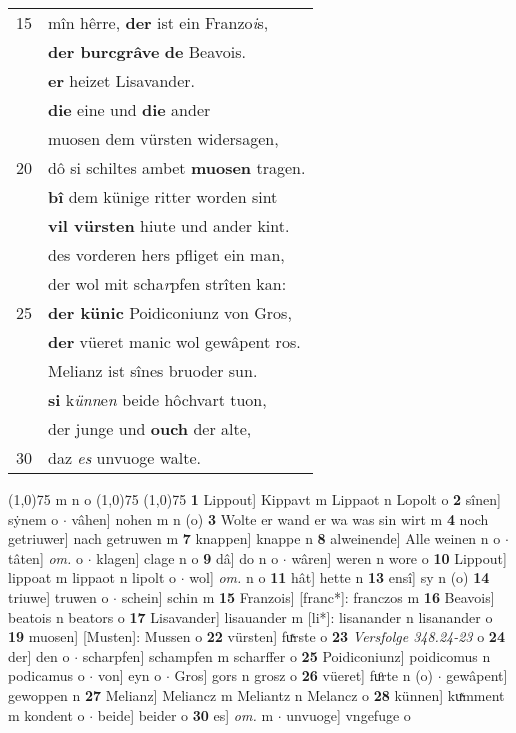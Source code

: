 \documentclass[8pt,a4paper,notitlepage]{article}
\begin{document}
\begin{table}[ht]
\begin{minipage}[t]{0.5\linewidth}
\begin{tabular}{rl}
15 & mîn hêrre, \textbf{der} ist ein Franzo\textit{i}s,\\ 
 & \textbf{der burcgrâve} \textbf{de} Beavois.\\ 
 & \textbf{er} heizet Lisavander.\\ 
 & \textbf{die} eine und \textbf{die} ander\\ 
 & muosen dem vürsten widersagen,\\ 
20 & dô si schiltes ambet \textbf{muosen} tragen.\\ 
 & \textbf{bî} dem künige ritter worden sint\\ 
 & \textbf{vil vürsten} hiute und ander kint.\\ 
 & des vorderen hers pfliget ein man,\\ 
 & der wol mit scha\textit{r}pfen strîten kan:\\ 
25 & \textbf{der künic} Poidiconiunz von Gros,\\ 
 & \textbf{der} vüeret manic wol gewâpent ros.\\ 
 & Melianz ist sînes bruoder sun.\\ 
 & \textbf{si} k\textit{ünn}e\textit{n} beide hôchvart tuon,\\ 
 & der junge und \textbf{ouch} der alte,\\ 
30 & daz \textit{es} unvuoge walte.\\ 
\end{tabular}
\scriptsize
\line(1,0){75} \newline
m n o \newline
\line(1,0){75} \newline
\newline
\line(1,0){75} \newline
\textbf{1} Lippout] Kippavt m Lippaot n Lopolt o \textbf{2} sînen] sẏnem o  $\cdot$ vâhen] nohen m n (o) \textbf{3} Wolte er wand er wa was sin wirt m \textbf{4} noch getriuwer] nach getruwen m \textbf{7} knappen] knappe n \textbf{8} alweinende] Alle weinen n o  $\cdot$ tâten] \textit{om.} o  $\cdot$ klagen] clage n o \textbf{9} dâ] do n o  $\cdot$ wâren] weren n wore o \textbf{10} Lippout] lippoat m lippaot n lipolt o  $\cdot$ wol] \textit{om.} n o \textbf{11} hât] hette n \textbf{13} ensî] sy n (o) \textbf{14} triuwe] truwen o  $\cdot$ schein] schin m \textbf{15} Franzois] [franc*]: franczos m \textbf{16} Beavois] beatois n beators o \textbf{17} Lisavander] lisauander m [li*]: lisanander n lisanander o \textbf{19} muosen] [Musten]: Mussen o \textbf{22} vürsten] fuͯrste o \textbf{23} \textit{Versfolge 348.24-23} o  \textbf{24} der] den o  $\cdot$ scharpfen] schampfen m scharffer o \textbf{25} Poidiconiunz] poidicomus n podicamus o  $\cdot$ von] eyn o  $\cdot$ Gros] gors n grosz o \textbf{26} vüeret] fuͦrte n (o)  $\cdot$ gewâpent] gewoppen n \textbf{27} Melianz] Meliancz m Meliantz n Melancz o \textbf{28} künnen] kuͯmment m kondent o  $\cdot$ beide] beider o \textbf{30} es] \textit{om.} m  $\cdot$ unvuoge] vngefuge o \newline
\end{minipage}
\end{table}
\end{document}
